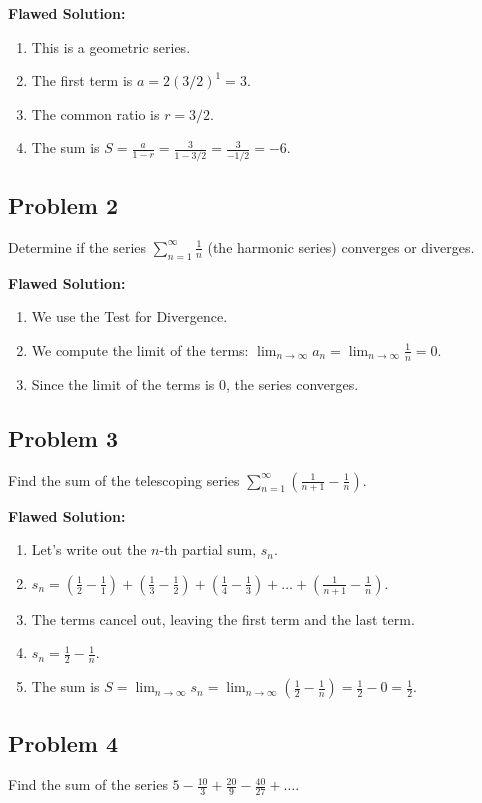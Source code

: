 \documentclass{article}
\begin{document}
\textbf{Flawed Solution:}
\begin{enumerate}
    \item This is a geometric series.
    \item The first term is $a = 2(3/2)^1 = 3$.
    \item The common ratio is $r = 3/2$.
    \item The sum is $S = \frac{a}{1-r} = \frac{3}{1 - 3/2} = \frac{3}{-1/2} = -6$.
\end{enumerate}

\subsection*{Problem 2}
Determine if the series $\sum_{n=1}^{\infty} \frac{1}{n}$ (the harmonic series) converges or diverges.

\textbf{Flawed Solution:}
\begin{enumerate}
    \item We use the Test for Divergence.
    \item We compute the limit of the terms: $\lim_{n \to \infty} a_n = \lim_{n \to \infty} \frac{1}{n} = 0$.
    \item Since the limit of the terms is 0, the series converges.
\end{enumerate}

\subsection*{Problem 3}
Find the sum of the telescoping series $\sum_{n=1}^{\infty} \left(\frac{1}{n+1} - \frac{1}{n}\right)$.

\textbf{Flawed Solution:}
\begin{enumerate}
    \item Let's write out the $n$-th partial sum, $s_n$.
    \item $s_n = (\frac{1}{2} - \frac{1}{1}) + (\frac{1}{3} - \frac{1}{2}) + (\frac{1}{4} - \frac{1}{3}) + \dots + (\frac{1}{n+1} - \frac{1}{n})$.
    \item The terms cancel out, leaving the first term and the last term.
    \item $s_n = \frac{1}{2} - \frac{1}{n}$.
    \item The sum is $S = \lim_{n \to \infty} s_n = \lim_{n \to \infty} (\frac{1}{2} - \frac{1}{n}) = \frac{1}{2} - 0 = \frac{1}{2}$.
\end{enumerate}

\subsection*{Problem 4}
Find the sum of the series $5 - \frac{10}{3} + \frac{20}{9} - \frac{40}{27} + \dots$.
\end{document}

